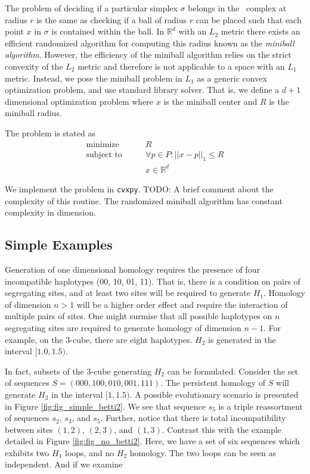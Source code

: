 The problem of deciding if a particular simplex $\sigma$ belongs in the \Cech\ complex at radius $r$ is the same as checking if a ball of radius $r$ can be placed such that each point $x$ in $\sigma$ is contained within the ball.
In $\mathbb{R}^d$ with an $L_2$ metric there exists an efficient randomized algorithm for computing this radius known as the \emph{miniball algorithm}.\autocite{Gartner:1999}
However, the efficiency of the miniball algorithm relies on the strict convexity of the $L_2$ metric and therefore is not applicable to a space with an $L_1$ metric.
Instead, we pose the miniball problem in $L_1$ as a generic convex optimization problem, and use standard library solver.
That is, we define a $d+1$ dimensional optimization problem where $x$ is the miniball center and $R$ is the miniball radius.

The problem is stated as
\begin{align*}
\text{minimize}\qquad   &  R \\
\text{subject to}\qquad & \forall p \in P: ||x-p||_{1} \leq R \\
                        & x \in \mathbb{R}^d
\end{align*}

We implement the problem in \texttt{cvxpy}.
TODO: A brief comment about the complexity of this routine.
The randomized miniball algorithm has constant complexity in dimension.

\subsection{Simple Examples}
\label{subsec:higher_dim_examples}
%
Generation of one dimensional homology requires the presence of four incompatible haplotypes (00, 10, 01, 11).
That is, there is a condition on pairs of segregating sites, and at least two sites will be required to generate $H_1$.
Homology of dimension $n>1$ will be a higher order effect and require the interaction of multiple pairs of sites.
One might surmise that all possible haplotypes on $n$ segregating sites are required to generate homology of dimension $n-1$.
For example, on the 3-cube, there are eight haplotypes.
$H_2$ is generated in the interval $[1.0,1.5)$.

In fact, subsets of the 3-cube generating $H_2$ can be formulated.
Consider the set of sequences $S=(000,100,010,001,111)$.
The persistent homology of $S$ will generate $H_2$ in the interval $[1,1.5)$.
A possible evolutionary scenario is presented in Figure \ref{fig:fig_simple_betti2}.
We see that sequence $s_5$ is a triple reassortment of sequences $s_2$, $s_3$, and $s_5$.
Further, notice that there is total incompatibility between sites $(1,2)$, $(2,3)$, and $(1,3)$.
Contrast this with the example detailed in Figure \ref{fig:fig_no_betti2}.
Here, we have a set of six sequences which exhibits two $H_1$ loops, and no $H_2$ homology.
The two loops can be seen as independent.
And if we examine

